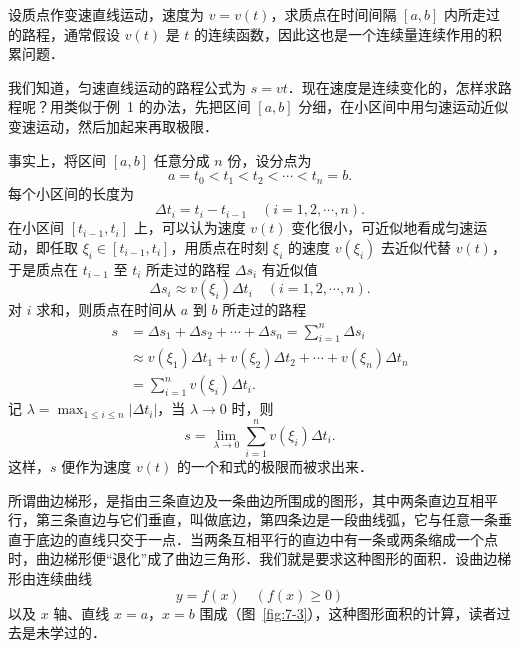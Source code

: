 \begin{example}[质点作变速直线运动的路程]
设质点作变速直线运动，速度为 $v = v(t)$，求质点在时间间隔 $[a,b]$ 内所走过的路程，通常假设 $v(t)$ 是 $t$ 的连续函数，因此这也是一个连续量连续作用的积累问题．
\end{example}

我们知道，匀速直线运动的路程公式为 $s = vt$．现在速度是连续变化的，怎样求路程呢？用类似于例~1 的办法，先把区间 $[a,b]$ 分细，在小区间中用匀速运动近似变速运动，然后加起来再取极限．

事实上，将区间 $[a,b]$ 任意分成 $n$ 份，设分点为
\[
a = t_0 < t_1 < t_2 < \cdots < t_n = b.
\]
每个小区间的长度为
\[
\Delta t_i = t_i - t_{i-1} \quad (i = 1, 2, \cdots, n).
\]
在小区间 $[t_{i-1}, t_i]$ 上，可以认为速度 $v(t)$ 变化很小，可近似地看成匀速运动，即任取 $\xi_i \in [t_{i-1}, t_i]$，用质点在时刻 $\xi_i$ 的速度 $v(\xi_i)$ 去近似代替 $v(t)$，于是质点在 $t_{i-1}$ 至 $t_i$ 所走过的路程 $\Delta s_i$ 有近似值
\[
\Delta s_i \approx v(\xi_i)\Delta t_i \quad (i = 1, 2, \cdots, n).
\]
对 $i$ 求和，则质点在时间从 $a$ 到 $b$ 所走过的路程
\begin{align*}
s &= \Delta s_1 + \Delta s_2 + \cdots + \Delta s_n = \sum_{i=1}^n \Delta s_i \\
&\approx v(\xi_1)\Delta t_1 + v(\xi_2)\Delta t_2 + \cdots + v(\xi_n)\Delta t_n \\
&= \sum_{i=1}^n v(\xi_i)\Delta t_i.
\end{align*}
记 $\lambda = \max_{1 \leqslant i \leqslant n}|\Delta t_i|$，当 $\lambda \to 0$ 时，则
\[
s = \lim_{\lambda \to 0}\sum_{i=1}^n v(\xi_i)\Delta t_i.
\]
这样，$s$ 便作为速度 $v(t)$ 的一个和式的极限而被求出来．

\begin{example}[曲边梯形的面积]
所谓曲边梯形，是指由三条直边及一条曲边所围成的图形，其中两条直边互相平行，第三条直边与它们垂直，叫做底边，第四条边是一段曲线弧，它与任意一条垂直于底边的直线只交于一点．当两条互相平行的直边中有一条或两条缩成一个点时，曲边梯形便“退化”成了曲边三角形．我们就是要求这种图形的面积．设曲边梯形由连续曲线
\[
y = f(x) \quad (f(x) \geqslant 0)
\]
以及 $x$ 轴、直线 $x = a$，$x = b$ 围成（图~\ref{fig:7-3}），这种图形面积的计算，读者过去是未学过的．
\end{example}

